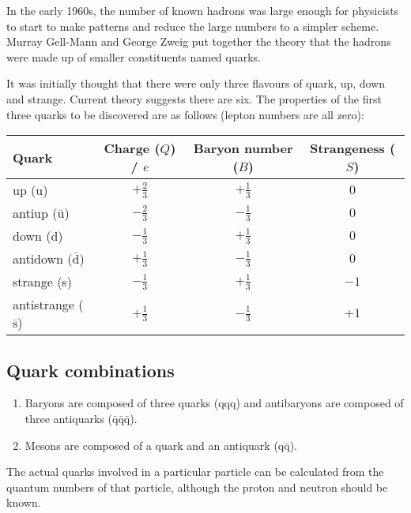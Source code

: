 \documentclass[a4paper,12pt]{article}
\begin{document}
In the early 1960s, the number of known hadrons was large enough for physicists to start to make patterns and reduce the large numbers to a simpler scheme.  Murray Gell-Mann and George Zweig put together the theory that the hadrons were made up of smaller constituents named quarks.

It was initially thought that there were only three flavours of quark, up, down and strange.  Current theory suggests there are six.  The properties of the first three quarks to be discovered are as follows (lepton numbers are all zero):\\

\renewcommand{\arraystretch}{1.2}
\noindent\begin{tabular}{lccc}
\hline
\hline
Quark & Charge ($Q$) / $e$ & Baryon number ($B$) & Strangeness ($S$) \\
\hline
up (u) & $+\frac{2}{3}$ & $+\frac{1}{3}$ & $0$ \\
antiup ($\bar{\mathrm{u}}$) & $-\frac{2}{3}$ & $-\frac{1}{3}$ & $0$ \\ 
down (d) & $-\frac{1}{3}$ & $+\frac{1}{3}$ & $0$ \\
antidown ($\bar{\mathrm{d}}$) & $+\frac{1}{3}$ & $-\frac{1}{3}$ & $0$ \\
strange (s) & $-\frac{1}{3}$ & $+\frac{1}{3}$ & $-1$ \\
antistrange ($\bar{\mathrm{s}}$) & $+\frac{1}{3}$ & $-\frac{1}{3}$ & $+1$ \\
\hline
\hline
\end{tabular}
\renewcommand{\arraystretch}{1}

\subsection{Quark combinations}

\begin{enumerate}
\item Baryons are composed of three quarks ($\mathrm{q}\mathrm{q}\mathrm{q}$) and antibaryons are composed of three antiquarks ($\bar{\mathrm{q}}\bar{\mathrm{q}}\bar{\mathrm{q}}$).
\item Mesons are composed of a quark and an antiquark ($\mathrm{q}\bar{\mathrm{q}}$).
\end{enumerate}

The actual quarks involved in a particular particle can be calculated from the quantum numbers of that particle, although the proton and neutron should be known.\\
\end{document}
